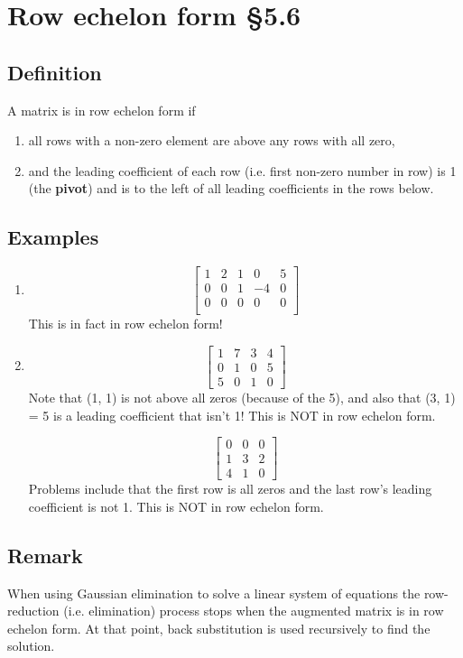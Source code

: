 \documentclass[11pt]{article}
\begin{document}
\section{Row echelon form §5.6}
\subsection{Definition}
A matrix is in row echelon form if
\begin{enumerate}[ (i) ]
\item all rows with a non-zero element are above any rows with all zero,
\item and the leading coefficient of each row (i.e. first non-zero number in row) is 1 (the \textbf{pivot}) and is to the left of all leading coefficients in the rows below.
\end{enumerate}

\subsection{Examples}
\begin{enumerate}[ (a) ]
\item
\[
\begin{bmatrix}
1 & 2 & 1 & 0 & 5 \\
0 & 0 & 1 & -4 & 0 \\
0 & 0 & 0 & 0 & 0 \\
\end{bmatrix}
\]
This is in fact in row echelon form!

\item
\[
\begin{bmatrix}
1 & 7 & 3 & 4 \\
0 & 1 & 0 & 5 \\
5 & 0 & 1 & 0
\end{bmatrix}
\]
Note that (1, 1) is not above all zeros (because of the 5), and also that (3, 1) = 5 is a leading coefficient that isn't 1! This is NOT in row echelon form.

\[
\begin{bmatrix}
0 & 0 & 0 \\
1 & 3 & 2 \\
4 & 1 & 0 
\end{bmatrix}
\]
Problems include that the first row is all zeros and the last row's leading coefficient is not 1. This is NOT in row echelon form.

\end{enumerate}

\subsection{Remark}
When using Gaussian elimination to solve a linear system of equations the row-reduction (i.e. elimination) process stops when the augmented matrix is in row echelon form. At that point, back substitution is used recursively to find the solution.
\end{document}
